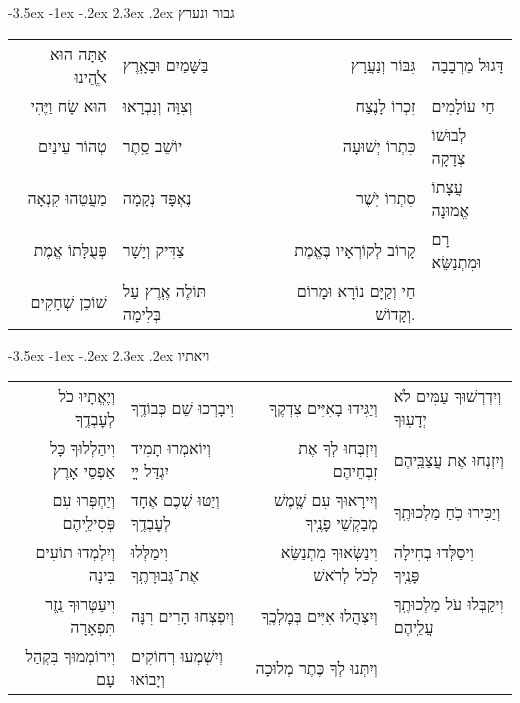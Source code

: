 \documentclass[12pt,letterpaper]{siddur}
\makeatletter
\renewcommand\section{\setcounter{mishnah}{0}\@startsection {section}{1}{\z@}%
                                   {-3.5ex \@plus -1ex \@minus -.2ex}%
                                   {2.3ex \@plus.2ex}%
                                   {\normalfont\large}}
\makeatother
\begin{document}
\section{גבור ונערץ}
\begin{longtable}[r]{r l r l}
אַתָּה הוּא ﭏֱֺהֵינוּ&בַּשָּׁמַיִם וּבָאָֽרֶץ&
גִּבּוֹר וְנַעֲרָץ&דָּגוּל מֵרְבָבָה\\
הוּא שָׂח וַיֶּהִי&וְצִוָּה וְנִבְרָאוּ&
זִכְרוֹ לָנֶצַח&חַי עוֹלָמִים\\
טְהוֹר עֵינַיִם&יוֹשֵׁב סֵֽתֶר&
כִּתְרוֹ יְשׁוּעָה&לְבוּשׁוֹ צְדָקָה\\
מַעֲטֵהוּ קִנְאָה&נֶאְפָּד נְקָמָה&
סִתְרוֹ יֹֽשֶׁר&עֲצָתוֹ אֱמוּנָה\\
פְּעֻלָּתוֹ אֱמֶת&צַדִּיק וְיָשָׁר&
קָרוֹב לְקוֹרְאָיו בֶּאֱמֶת&רָם וּמִתְנַשֵּׂא\\
שׁוֹכֵן שְׁחָקִים&תּוֹלֶה אֶֽרֶץ עַל בְּלִימָה&
חַי וְקַיָּם נוֹרָא וּמָרוֹם וְקָדוֹשׁ.
\end{longtable}
\section{ויאתיו}
\begin{longtable}[r]{r l r l}
וְיֶאֱתָיוּ כֹל לְעׇבְדֶֽךָ&
וִיבָרְכוּ שֵׁם כְּבוֹדֶֽךָ&
וְיַגִּידוּ בָאִיִּים צִדְקֶֽךָ&
וְיִדְרְשׁוּךָ עַמִּים לֹא יְדָעֽוּךָ\\
וִיהַלְלוּךָ כָּל אַפְסֵי אָרֶץ&
וְיוֹאמְרוּ תָמִיד יִגְדַּל ײֳ&
וְיִזְבְּחוּ לְךָ אֶת זִבְחֵיהֶם&
וְיִזְנְחוּ אֶת עֲצַבֵּֽיהֶם\\
וְיַחְפְּרוּ עִם פְּסִילֵֽיהֶם&
וְיַטּוּ שְׁכֶם אֶחָד לְעׇבְדֶֽךָ&
וְיִירָאוּךָ עִם שֶֽׁמֶשׁ מְבַקְשֵׁי פָנֶֽיךָ&
וְיַכִּירוּ כֹֽחַ מַלְכוּתֶֽךָ\\
וְיִלְמְדוּ תוֹעִים בִּינָה&
וִימַלְּלוּ אֶת־גְּבוּרָתֶֽךָ&
וִינַשְּׂאוּךָ מִתְנַשֵּׂא לְכֹל לְרֹאשׁ&
וִיסַלְּדוּ בְחִילָה פָּנֶֽיךָ\\
וִיעַטְּרוּךָ נֵֽזֶר תִּפְאָרָה&
וְיִפְצְחוּ הָרִים רִנָּה&
וְיִצְהֲלוּ אִיִּים בְּמׇלְכֶֽךָ&
וִיקַבְּלוּ עֹל מַלְכוּתֶֽךָ עֲלֵֽיהֶם\\
וִירוֹמְמוּךָ בִּקְהַל עָם&
וְיִשְׁמְעוּ רְחוֹקִים וְיָבוֹאוּ&
וְיִתְּנוּ לְךָ כֶּתֶר מְלוּכָה
\end{longtable}
\end{document}
